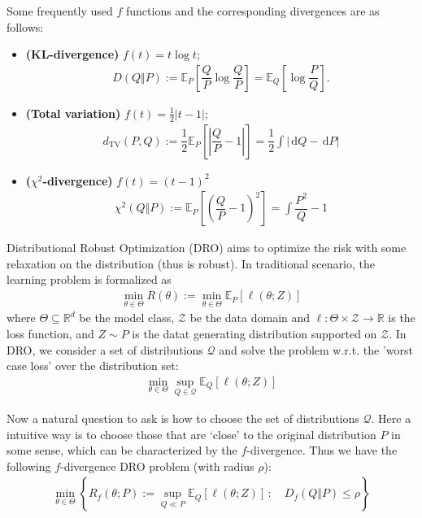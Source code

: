 \documentclass[11pt,a4paper]{article}
\numberwithin{equation}{section}%
\begin{document}
Some frequently used $f$ functions and the corresponding divergences are as follows:
\begin{itemize}
    \item \textbf{(KL-divergence)} $f(t) = t\log t$;
    \begin{align*}
        D(Q\Vert P) := \mathbb{E}_{ P }\left[ \dfrac{ Q }{ P } \log \dfrac{ Q }{ P } \right] = \mathbb{E}_{ Q }\left[ \log \dfrac{ P }{ Q } \right]. 
    \end{align*}
    \item \textbf{(Total variation)} $f(t) = \frac{1}{2}|t-1|$;
    \begin{align*}
        d_\mathrm{ TV }(P,Q):= \dfrac{1}{2}\mathbb{E}_{ P }\left[ \left\vert \dfrac{ Q }{ P } - 1  \right\vert  \right] = \dfrac{ 1 }{ 2 }\int \left\vert \,\mathrm{d}Q - \,\mathrm{d}P \right\vert  
    \end{align*}
    \item \textbf{($ \chi^2 $-divergence)} $ f(t)=(t-1)^2 $
    \begin{align*}
        \chi^2(Q\Vert P) := \mathbb{E}_{ P }\left[ (\dfrac{ Q }{ P }-1 )^2 \right] = \int \dfrac{ P^2 }{ Q }   - 1
    \end{align*}
\end{itemize}




Distributional Robust Optimization (DRO) aims to optimize the risk with some relaxation on the distribution (thus is robust). In traditional scenario, the learning problem is formalized as
\begin{align*}
    \mathop{ \min }\limits_{\theta \in \Theta }R(\theta ):= \mathop{ \min }\limits_{\theta \in\Theta }\mathbb{E}_{ P }\left[ \ell(\theta ;Z) \right]    
\end{align*}
where $ \Theta \subseteq \mathbb{R}^d $ be the model class, $ \mathcal{Z} $ be the data domain and $ \ell:\Theta \times \mathcal{ Z }\to \mathbb{R}  $ is the loss function, and $ Z\sim P $ is the datat generating distribution supported on $ \mathcal{ Z } $. In DRO, we consider a set of distributions $ \mathcal{ Q } $ and solve the problem w.r.t. the 'worst case loss' over the distribution set:
\begin{align*}
    \mathop{ \min }\limits_{\theta \in\Theta }\mathop{ \sup }\limits_{Q\in \mathcal{ Q } }\mathbb{E}_{ Q }\left[ \ell(\theta ;Z) \right]    
\end{align*}


Now a natural question to ask is how to choose the set of distributions $ \mathcal{ Q } $. Here a intuitive way is to choose those that are `close' to the original distribution $ P $ in some sense, which can be characterized by the $ f $-divergence. Thus we have the following $ f $-divergence DRO problem (with radius $ \rho  $):
\begin{align*}
    \mathop{ \min }\limits_{\theta \in\Theta }\left\{ R_f(\theta ;P):= \mathop{ \sup }\limits_{Q\ll P} \mathbb{E}_{ Q }\left[ \ell(\theta ;Z) \right] \,:\quad D_f(Q\Vert P)\leq \rho   \right\}  
\end{align*}
\end{document}
